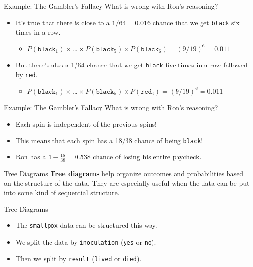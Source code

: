 \begin{frame}{Example: The Gambler's Fallacy}
    What is wrong with Ron's reasoning?
    \begin{itemize}
        \item It's true that there is close to a $1/64=0.016$ chance that we get \texttt{black} six times in a row.
        \begin{itemize}
            \item $P(\texttt{black}_1)\times\dots\times P(\texttt{black}_5)\times P(\texttt{black}_6) = (9/19)^6 = 0.011$
        \end{itemize}
        \item But there's also a 1/64 chance that we get \texttt{black} five times in a row followed by \texttt{red}.
        \begin{itemize}
            \item $P(\texttt{black}_1)\times\dots\times P(\texttt{black}_5)\times P(\texttt{red}_6) = (9/19)^6 = 0.011$
        \end{itemize}
    \end{itemize}
\end{frame}

\begin{frame}{Example: The Gambler's Fallacy}
    What is wrong with Ron's reasoning?
    \begin{itemize}
        \item Each spin is independent of the previous spins!
        \item This means that each spin has a 18/38 chance of being \texttt{black}!
        \item Ron has a $1-\frac{18}{38}=0.538$ chance of losing his entire paycheck. 
    \end{itemize}
\end{frame}

\begin{frame}{Tree Diagrams}
    \textbf{Tree diagrams} help organize outcomes and probabilities based on the structure of the data. They are especially useful when the data can be put into some kind of sequential structure.
\end{frame}

\begin{frame}{Tree Diagrams}
    \begin{itemize}
        \item The \texttt{smallpox} data can be structured this way. 
        \item We split the data by \texttt{inoculation} (\texttt{yes} or \texttt{no}).
        \item Then we split by \texttt{result} (\texttt{lived} or \texttt{died}).
    \end{itemize}
\end{frame}

